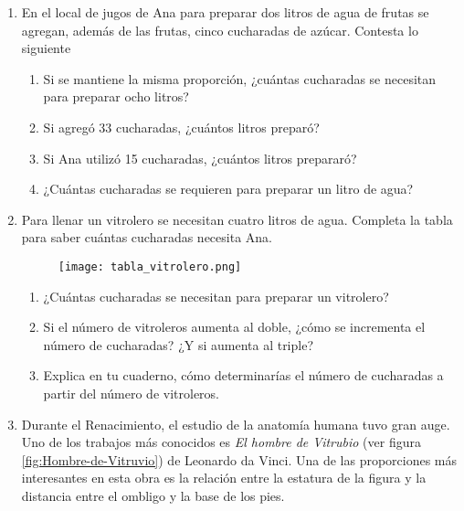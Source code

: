 \begin{enumerate}
    \item En el local de jugos de Ana para preparar dos litros de agua de frutas se agregan,
          además de las frutas, cinco cucharadas de azúcar. Contesta lo siguiente
          \begin{enumerate}
              \item Si se mantiene la misma proporción, ¿cuántas cucharadas se necesitan para preparar ocho litros?
              \item Si agregó 33 cucharadas, ¿cuántos litros preparó?
              \item Si Ana utilizó 15 cucharadas, ¿cuántos litros prepararó?
              \item ¿Cuántas cucharadas se requieren para preparar un litro de agua?
          \end{enumerate}
    \item  Para llenar un vitrolero se necesitan cuatro litros de agua. Completa la tabla para
          saber cuántas cucharadas necesita Ana.
          \begin{figure}[H]
              \centering
              \texttt{[image: tabla\_vitrolero.png]}
              \label{tab:tabla_vitrolero}
          \end{figure}
          \begin{enumerate}
              \item ¿Cuántas cucharadas se necesitan para preparar un vitrolero?
              \item Si el número de vitroleros aumenta al doble, ¿cómo se incrementa el número de
                    cucharadas? ¿Y si aumenta al triple?
              \item Explica en tu cuaderno, cómo determinarías el número de cucharadas a partir del
                    número de vitroleros.
          \end{enumerate}

    \item Durante el Renacimiento, el estudio de la anatomía humana tuvo gran auge. Uno
          de los trabajos más conocidos es \emph{El hombre de Vitrubio} (ver figura \ref{fig:Hombre-de-Vitruvio}) de Leonardo
          da Vinci. Una de las proporciones más interesantes en esta obra es la relación entre
          la estatura de la figura y la distancia entre el ombligo y la base de los pies.


\end{enumerate}
